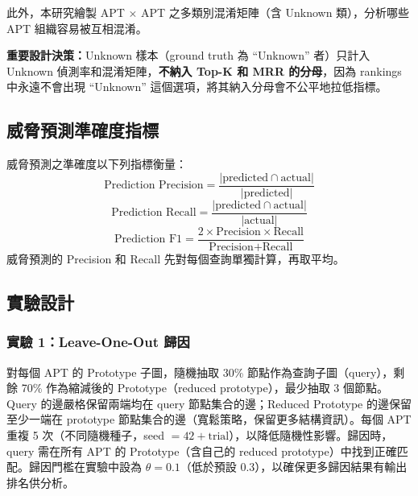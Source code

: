\begin{ZhChapter}
此外，本研究繪製 APT $\times$ APT 之多類別混淆矩陣（含 Unknown 類），分析哪些 APT 組織容易被互相混淆。

\textbf{重要設計決策：}Unknown 樣本（ground truth 為 ``Unknown'' 者）只計入 Unknown 偵測率和混淆矩陣，\textbf{不納入 Top-K 和 MRR 的分母}，因為 rankings 中永遠不會出現 ``Unknown'' 這個選項，將其納入分母會不公平地拉低指標。

\subsection{威脅預測準確度指標}
\label{subsec:prediction-metrics}

威脅預測之準確度以下列指標衡量：
\begin{equation}
    \text{Prediction Precision} = \frac{|\text{predicted} \cap \text{actual}|}{|\text{predicted}|}
    \label{eq:pred-precision}
\end{equation}
\begin{equation}
    \text{Prediction Recall} = \frac{|\text{predicted} \cap \text{actual}|}{|\text{actual}|}
    \label{eq:pred-recall}
\end{equation}
\begin{equation}
    \text{Prediction F1} = \frac{2 \times \text{Precision} \times \text{Recall}}{\text{Precision} + \text{Recall}}
    \label{eq:pred-f1}
\end{equation}
威脅預測的 Precision 和 Recall 先對每個查詢單獨計算，再取平均。

\subsection{實驗設計}
\label{subsec:experiments}

\subsubsection{實驗 1：Leave-One-Out 歸因}
\label{subsec:exp1}

對每個 APT 的 Prototype 子圖，隨機抽取 30\% 節點作為查詢子圖（query），剩餘 70\% 作為縮減後的 Prototype（reduced prototype），最少抽取 3 個節點。Query 的邊嚴格保留兩端均在 query 節點集合的邊；Reduced Prototype 的邊保留至少一端在 prototype 節點集合的邊（寬鬆策略，保留更多結構資訊）。每個 APT 重複 5 次（不同隨機種子，seed $= 42 + \text{trial}$），以降低隨機性影響。歸因時，query 需在所有 APT 的 Prototype（含自己的 reduced prototype）中找到正確匹配。歸因門檻在實驗中設為 $\theta = 0.1$（低於預設 0.3），以確保更多歸因結果有輸出排名供分析。


\end{ZhChapter}
